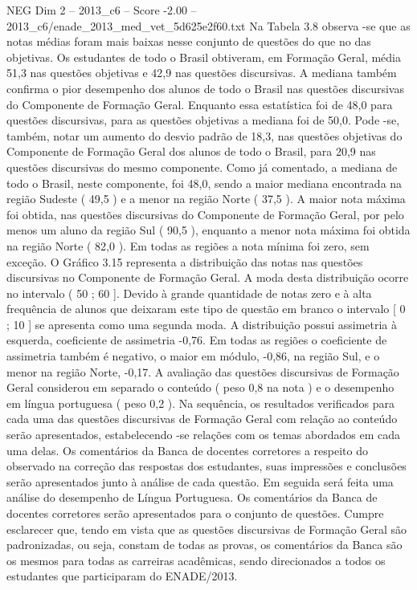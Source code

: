\begin{textsample}{NEG Dim 2 – 2013\_c6 – Score -2.00 – 2013\_c6/enade\_2013\_med\_vet\_5d625e2f60.txt}
Na Tabela 3.8 observa -se que as notas médias foram mais baixas nesse conjunto de questões do que no das objetivas.
Os estudantes de todo o Brasil obtiveram, em Formação Geral, média 51,3 nas questões objetivas e 42,9 nas questões discursivas.
A mediana também confirma o pior desempenho dos alunos de todo o Brasil nas questões discursivas do Componente de Formação Geral.
Enquanto essa estatística foi de 48,0 para questões discursivas, para as questões objetivas a mediana foi de 50,0.
Pode -se, também, notar um aumento do desvio padrão de 18,3, nas questões objetivas do Componente de Formação Geral dos alunos de todo o Brasil, para 20,9 nas questões discursivas do mesmo componente.
Como já comentado, a mediana de todo o Brasil, neste componente, foi 48,0, sendo a maior mediana encontrada na região Sudeste ( 49,5 ) e a menor na região Norte ( 37,5 ).
A maior nota máxima foi obtida, nas questões discursivas do Componente de Formação Geral, por pelo menos um aluno da região Sul ( 90,5 ), enquanto a menor nota máxima foi obtida na região Norte ( 82,0 ).
Em todas as regiões a nota mínima foi zero, sem exceção.
O Gráfico 3.15 representa a distribuição das notas nas questões discursivas no Componente de Formação Geral.
A moda desta distribuição ocorre no intervalo ( 50 ; 60 ].
Devido à grande quantidade de notas zero e à alta frequência de alunos que deixaram este tipo de questão em branco o intervalo [ 0 ; 10 ] se apresenta como uma segunda moda.
A distribuição possui assimetria à esquerda, coeficiente de assimetria -0,76.
Em todas as regiões o coeficiente de assimetria também é negativo, o maior em módulo, -0,86, na região Sul, e o menor na região Norte, -0,17.
A avaliação das questões discursivas de Formação Geral considerou em separado o conteúdo ( peso 0,8 na nota ) e o desempenho em língua portuguesa ( peso 0,2 ).
Na sequência, os resultados verificados para cada uma das questões discursivas de Formação Geral com relação ao conteúdo serão apresentados, estabelecendo -se relações com os temas abordados em cada uma delas.
Os comentários da Banca de docentes corretores a respeito do observado na correção das respostas dos estudantes, suas impressões e conclusões serão apresentados junto à análise de cada questão.
Em seguida será feita uma análise do desempenho de Língua Portuguesa.
Os comentários da Banca de docentes corretores serão apresentados para o conjunto de questões.
Cumpre esclarecer que, tendo em vista que as questões discursivas de Formação Geral são padronizadas, ou seja, constam de todas as provas, os comentários da Banca são os mesmos para todas as carreiras acadêmicas, sendo direcionados a todos os estudantes que participaram do ENADE/2013.

\end{textsample}
